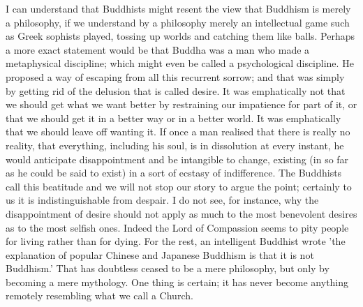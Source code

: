 I can understand that Buddhists might resent the view that Buddhism is merely a philosophy, if we understand by a philosophy merely an intellectual game such as Greek sophists played, tossing up worlds and catching them like balls. Perhaps a more exact statement would be that Buddha was a man who made a metaphysical discipline; which might even be called a psychological discipline. He proposed a way of escaping from all this recurrent sorrow; and that was simply by getting rid of the delusion that is called desire. It was emphatically not that we should get what we want better by restraining our impatience for part of it, or that we should get it in a better way or in a better world. It was emphatically that we should leave off wanting it. If once a man realised that there is really no reality, that everything, including his soul, is in dissolution at every instant, he would anticipate disappointment and be intangible to change, existing (in so far as he could be said to exist) in a sort of ecstasy of indifference. The Buddhists call this beatitude and we will not stop our story to argue the point; certainly to us it is indistinguishable from despair. I do not see, for instance, why the disappointment of desire should not apply as much to the most benevolent desires as to the most selfish ones. Indeed the Lord of Compassion seems to pity people for living rather than for dying. For the rest, an intelligent Buddhist wrote 'the explanation of popular Chinese and Japanese Buddhism is that it is not Buddhism.' That has doubtless ceased to be a mere philosophy, but only by becoming a mere mythology. One thing is certain; it has never become anything remotely resembling what we call a Church.

